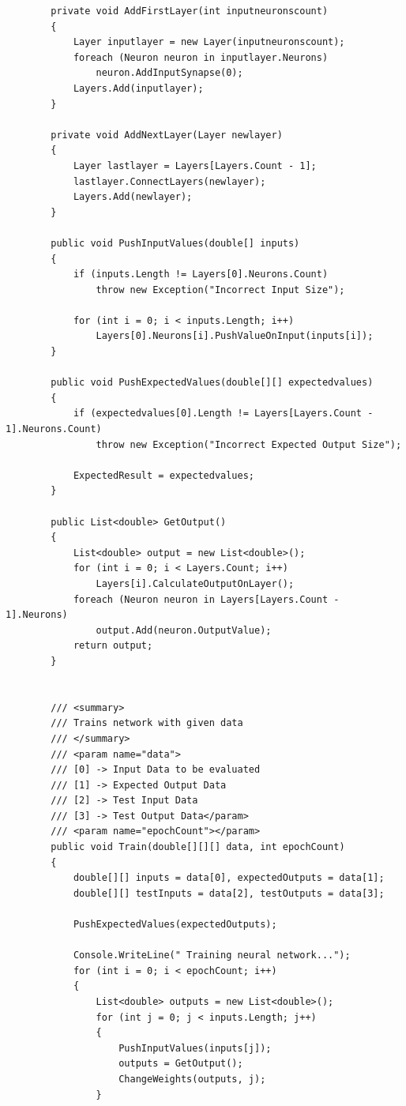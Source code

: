 \documentclass[12pt,a4paper]{article}
\begin{document}
\begin{lstlisting}
        private void AddFirstLayer(int inputneuronscount)
        {
            Layer inputlayer = new Layer(inputneuronscount);
            foreach (Neuron neuron in inputlayer.Neurons)
                neuron.AddInputSynapse(0);
            Layers.Add(inputlayer);
        }

        private void AddNextLayer(Layer newlayer)
        {
            Layer lastlayer = Layers[Layers.Count - 1];
            lastlayer.ConnectLayers(newlayer);
            Layers.Add(newlayer);
        }

        public void PushInputValues(double[] inputs)
        {
            if (inputs.Length != Layers[0].Neurons.Count)
                throw new Exception("Incorrect Input Size");

            for (int i = 0; i < inputs.Length; i++)
                Layers[0].Neurons[i].PushValueOnInput(inputs[i]);
        }

        public void PushExpectedValues(double[][] expectedvalues)
        {
            if (expectedvalues[0].Length != Layers[Layers.Count - 1].Neurons.Count)
                throw new Exception("Incorrect Expected Output Size");

            ExpectedResult = expectedvalues;
        }

        public List<double> GetOutput()
        {
            List<double> output = new List<double>();
            for (int i = 0; i < Layers.Count; i++)
                Layers[i].CalculateOutputOnLayer();
            foreach (Neuron neuron in Layers[Layers.Count - 1].Neurons)
                output.Add(neuron.OutputValue);
            return output;
        }


        /// <summary>
        /// Trains network with given data
        /// </summary>
        /// <param name="data">
        /// [0] -> Input Data to be evaluated
        /// [1] -> Expected Output Data
        /// [2] -> Test Input Data
        /// [3] -> Test Output Data</param>
        /// <param name="epochCount"></param>
        public void Train(double[][][] data, int epochCount)
        {
            double[][] inputs = data[0], expectedOutputs = data[1];
            double[][] testInputs = data[2], testOutputs = data[3];

            PushExpectedValues(expectedOutputs);

            Console.WriteLine(" Training neural network...");
            for (int i = 0; i < epochCount; i++)
            {
                List<double> outputs = new List<double>();
                for (int j = 0; j < inputs.Length; j++)
                {
                    PushInputValues(inputs[j]);
                    outputs = GetOutput();
                    ChangeWeights(outputs, j);
                }


\end{lstlisting}
\end{document}
